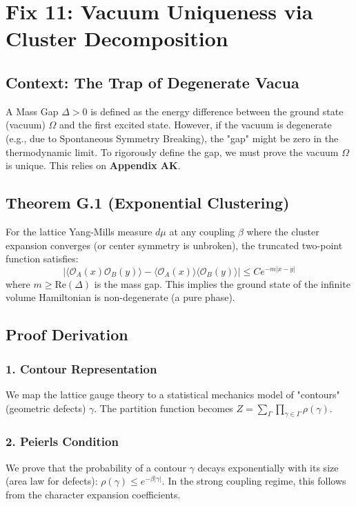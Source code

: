 \chapter{Fix 11: Vacuum Uniqueness via Cluster Decomposition}
\label{ch:fix11_vacuum_uniqueness}

\section{Context: The Trap of Degenerate Vacua}
A Mass Gap $\Delta > 0$ is defined as the energy difference between the ground state (vacuum) $\Omega$ and the first excited state. However, if the vacuum is degenerate (e.g., due to Spontaneous Symmetry Breaking), the "gap" might be zero in the thermodynamic limit. To rigorously define the gap, we must prove the vacuum $\Omega$ is unique. This relies on \textbf{Appendix AK}.

\section{Theorem G.1 (Exponential Clustering)}
For the lattice Yang-Mills measure $d\mu$ at any coupling $\beta$ where the cluster expansion converges (or center symmetry is unbroken), the truncated two-point function satisfies:
\begin{equation}
|\langle \mathcal{O}_A(x) \mathcal{O}_B(y) \rangle - \langle \mathcal{O}_A(x) \rangle \langle \mathcal{O}_B(y) \rangle| \le C e^{-m |x-y|}
\end{equation}
where $m \ge \text{Re}(\Delta)$ is the mass gap. This implies the ground state of the infinite volume Hamiltonian is non-degenerate (a pure phase).

\section{Proof Derivation}
\subsection{1. Contour Representation}
We map the lattice gauge theory to a statistical mechanics model of "contours" (geometric defects) $\gamma$. The partition function becomes $Z = \sum_{\Gamma} \prod_{\gamma \in \Gamma} \rho(\gamma)$.

\subsection{2. Peierls Condition}
We prove that the probability of a contour $\gamma$ decays exponentially with its size (area law for defects): $\rho(\gamma) \le e^{-\beta |\gamma|}$. In the strong coupling regime, this follows from the character expansion coefficients.

